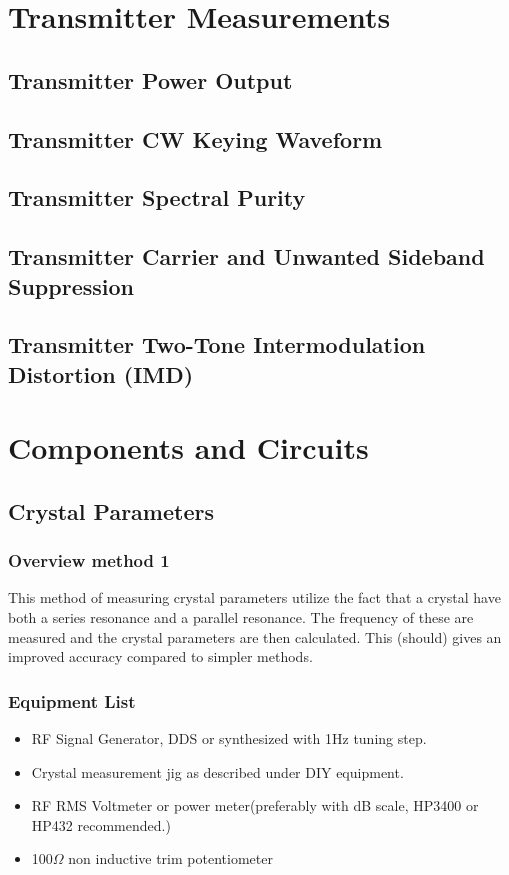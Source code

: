\documentclass[10pt,letterpaper]{book}
\begin{document}
\chapter{Transmitter Measurements}
%
\section{Transmitter Power Output}
\section{Transmitter CW Keying Waveform}
\section{Transmitter Spectral Purity}
\section{Transmitter Carrier and Unwanted Sideband Suppression}
\section{Transmitter Two-Tone Intermodulation Distortion (IMD)}


\chapter{Components and Circuits}

\newpage
\section{Crystal Parameters}

\subsection*{Overview method 1}
This method of measuring crystal parameters utilize the fact that a crystal have both a series resonance and a parallel resonance. The frequency of these are measured and the crystal parameters are then calculated. This (should) gives an improved accuracy compared to simpler methods. 
\subsection*{Equipment List}
\begin{itemize}
	\item RF Signal Generator, DDS or synthesized with 1Hz tuning step.
	\item Crystal measurement jig as described under DIY equipment.
	\item RF RMS Voltmeter or power meter(preferably with dB scale, HP3400 or HP432 recommended.) 
	\item 100$\Omega$ non inductive trim potentiometer
\end{itemize}
\end{document}
